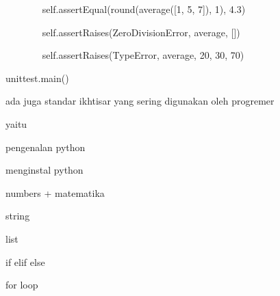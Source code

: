 \noindent 
{\fontsize{14pt}{14pt}\selectfont ~~~~~~~ self.assertEqual(round(average([1, 5, 7]), 1), 4.3) \\} \par
\vspace{14pt}
\noindent 
{\fontsize{14pt}{14pt}\selectfont ~~~~~~~ self.assertRaises(ZeroDivisionError, average, []) \\} \par
\vspace{14pt}
\noindent 
{\fontsize{14pt}{14pt}\selectfont ~~~~~~~ self.assertRaises(TypeError, average, 20, 30, 70) \\} \par
\vspace{14pt}
\noindent 
{\fontsize{14pt}{14pt}\selectfont unittest.main()  \\} \par
\vspace{14pt}
\noindent 
{\fontsize{14pt}{14pt}\selectfont ada juga standar ikhtisar yang sering digunakan oleh progremer  \\} \par
\noindent 
{\fontsize{14pt}{14pt}\selectfont yaitu \\} \par
\vspace{14pt}
\noindent 
{\fontsize{14pt}{14pt}\selectfont pengenalan python \\} \par
\vspace{14pt}
\noindent 
{\fontsize{14pt}{14pt}\selectfont menginstal python \\} \par
\vspace{14pt}
\noindent 
{\fontsize{14pt}{14pt}\selectfont numbers + matematika \\} \par
\vspace{14pt}
\noindent 
{\fontsize{14pt}{14pt}\selectfont string \\} \par
\vspace{14pt}
\noindent 
{\fontsize{14pt}{14pt}\selectfont list  \\} \par
\vspace{14pt}
\noindent 
{\fontsize{14pt}{14pt}\selectfont if elif else \\} \par
\vspace{14pt}
\noindent 
{\fontsize{14pt}{14pt}\selectfont for loop \\} \par
